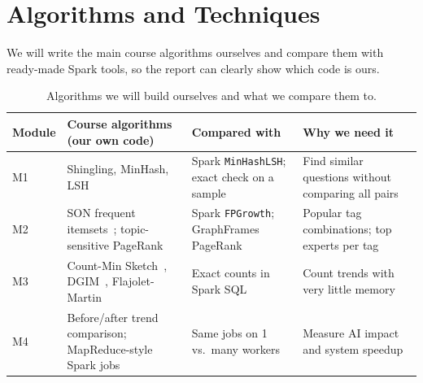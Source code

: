 \documentclass[11pt,a4paper]{article}
\begin{document}
\section{Algorithms and Techniques}

We will write the main course algorithms ourselves and compare them with
ready-made Spark tools, so the report can clearly show which code is ours.

\begin{table}[H]
\centering
\caption{Algorithms we will build ourselves and what we compare them to.}
\label{tab:alg}
\small
\begin{tabularx}{\textwidth}{@{}l Y Y Y@{}}
\toprule
\textbf{Module} & \textbf{Course algorithms (our own code)} & \textbf{Compared with} & \textbf{Why we need it} \\
\midrule
M1 & Shingling, MinHash, LSH~\cite{broder1997,indyk1998} & Spark \texttt{MinHashLSH}; exact check on a sample & Find similar questions without comparing all pairs \\
M2 & SON frequent itemsets~\cite{son1995}; topic-sensitive PageRank~\cite{haveliwala2002} & Spark \texttt{FPGrowth}; GraphFrames PageRank & Popular tag combinations; top experts per tag \\
M3 & Count-Min Sketch~\cite{cormode2005}, DGIM~\cite{dgim2002}, Flajolet-Martin~\cite{fm1985} & Exact counts in Spark SQL & Count trends with very little memory \\
M4 & Before/after trend comparison; MapReduce-style Spark jobs & Same jobs on 1 vs.\ many workers & Measure AI impact and system speedup \\
\bottomrule
\end{tabularx}
\end{table}

\end{document}
